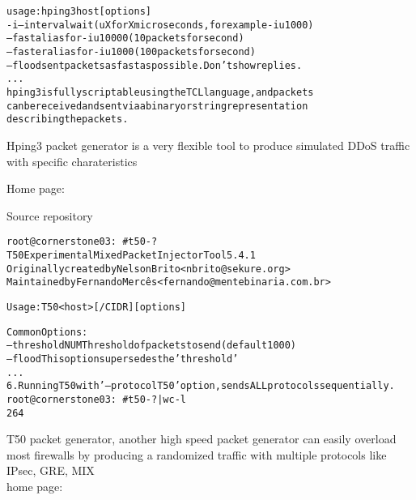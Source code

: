 \documentclass[20pt,landscape,a4paper,footrule]{foils}
\begin{document}

\begin{alltt}\footnotesize
usage: hping3 host [options]
  -i  --interval  wait (uX for X microseconds, for example -i u1000)
      --fast      alias for -i u10000 (10 packets for second)
      --faster    alias for -i u1000 (100 packets for second)
      --flood	   sent packets as fast as possible. Don't show replies.
...
hping3 is fully scriptable using the TCL language, and packets
can be received and sent via a binary or string representation
describing the packets.
\end{alltt}

\begin{list2}
\item Hping3 packet generator is a very flexible tool to produce simulated DDoS traffic with specific charateristics
\item Home page: 
\item Source repository 
\end{list2}



\begin{alltt}\footnotesize
root@cornerstone03:~# t50 -?
T50 Experimental Mixed Packet Injector Tool 5.4.1
Originally created by Nelson Brito <nbrito@sekure.org>
Maintained by Fernando Mercês <fernando@mentebinaria.com.br>

Usage: T50 <host> [/CIDR] [options]

Common Options:
    --threshold NUM        Threshold of packets to send     (default 1000)
    --flood                This option supersedes the 'threshold'
...
6. Running T50 with '--protocol T50' option, sends ALL protocols sequentially.
root@cornerstone03:~# t50 -? | wc -l
264
\end{alltt}

\begin{list2}
\item T50 packet generator, another high speed packet generator
can easily overload most firewalls by producing a randomized traffic with multiple protocols like IPsec, GRE, MIX \\
home page: 
\end{list2}



\end{document}
